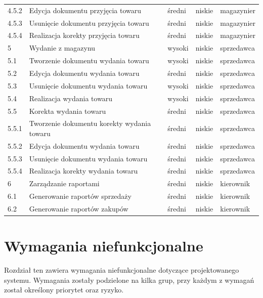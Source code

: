 \begin{table}[ht]
\begin{center}
\begin{tabular}{| l | l | l | l | l |}
            4.5.2 & Edycja dokumentu przyjęcia towaru & średni & niskie & magazynier \\
            4.5.3 & Usunięcie dokumentu przyjęcia towaru & średni & niskie & magazynier \\
            4.5.4 & Realizacja korekty przyjęcia towaru & średni & niskie & magazynier \\ 
            \hline
		   	5 & Wydanie z magazynu & wysoki & niskie & sprzedawca \\
		   	5.1 & Tworzenie dokumentu wydania towaru & wysoki & niskie & sprzedawca \\
		   	5.2 & Edycja dokumentu wydania towaru & średni & niskie & sprzedawca \\
		   	5.3 & Usunięcie dokumentu wydania towaru & wysoki & niskie & sprzedawca \\
		   	5.4 & Realizacja wydania towaru & wysoki & niskie & sprzedawca \\
		   	5.5 & Korekta wydania towaru & średni & niskie & sprzedawca \\
            5.5.1 & Tworzenie dokumentu korekty wydania towaru & średni & niskie & sprzedawca \\
            5.5.2 & Edycja dokumentu wydania towaru & średni & niskie & sprzedawca \\
            5.5.3 & Usunięcie dokumentu wydania towaru & średni & niskie & sprzedawca \\
            5.5.4 & Realizacja korekty wydania towaru & średni & niskie & sprzedawca \\ 
		   	\hline
		   	6 & Zarządzanie raportami & średni & niskie & kierownik \\
		   	6.1 & Generowanie raportów sprzedaży & średni & niskie & kierownik \\
		   	6.2 & Generowanie raportów zakupów & średni & niskie & kierownik \\
		   	\hline
	    \end{tabular}
	\end{center}
\end{table}
\FloatBarrier

\section{Wymagania niefunkcjonalne}

Rozdział ten zawiera wymagania niefunkcjonalne dotyczące projektowanego systemu.
Wymagania zostały podzielone na kilka grup, przy każdym z wymagań został
określony priorytet oraz ryzyko.

